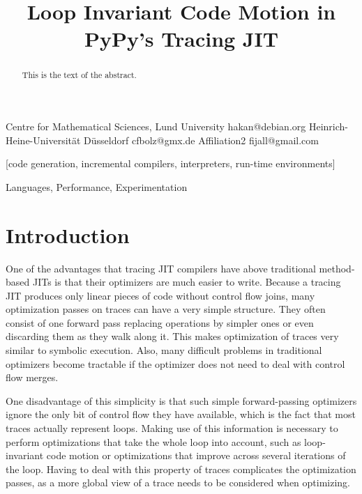 \documentclass[preprint]{sigplanconf}
\begin{document}
\copyrightdata{[to be supplied]} 


\title{Loop Invariant Code Motion in PyPy's Tracing JIT}

           {Centre for Mathematical Sciences, Lund University}
           {hakan@debian.org}
           {Heinrich-Heine-Universität Düsseldorf}
           {cfbolz@gmx.de}
           {Affiliation2}
           {fijall@gmail.com}

\maketitle

\begin{abstract}
This is the text of the abstract.
\end{abstract}

[code generation,
incremental compilers, interpreters, run-time environments]

\terms
Languages, Performance, Experimentation


\section{Introduction}

One of the advantages that tracing JIT compilers have above traditional
method-based
JITs is that their optimizers are much easier to write. Because a tracing JIT
produces only linear pieces of code without control flow joins, many
optimization passes on traces can have a very simple structure. They often
consist of one forward pass replacing operations by simpler ones or even
discarding them as they walk along it. This makes
optimization of traces very similar to symbolic execution. Also, many
difficult problems in traditional optimizers become tractable if the optimizer
does not need to deal with control flow merges.

One disadvantage of this simplicity is that such simple forward-passing
optimizers ignore the only bit of control flow they have available, which is
the fact that most traces actually represent loops. Making use of this
information is necessary to perform optimizations that take the whole loop into
account, such as loop-invariant code
motion or optimizations that improve across several iterations of the loop.
Having to deal with this property of traces complicates the optimization passes,
as a more global view of a trace needs to be considered when optimizing.
\end{document}
